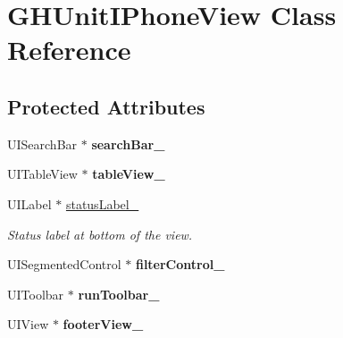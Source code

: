 \hypertarget{interface_g_h_unit_i_phone_view}{
\section{\-G\-H\-Unit\-I\-Phone\-View \-Class \-Reference}
\label{interface_g_h_unit_i_phone_view}
}
\subsection*{\-Protected \-Attributes}
\begin{DoxyCompactItemize}
\item 
\hypertarget{interface_g_h_unit_i_phone_view_a130641e5cd1b62824d73e4c19c73295b}{
\-U\-I\-Search\-Bar $\ast$ {\bfseries search\-Bar\-\_\-}}
\label{interface_g_h_unit_i_phone_view_a130641e5cd1b62824d73e4c19c73295b}

\item 
\hypertarget{interface_g_h_unit_i_phone_view_aa5426f813a9915e2af33ddbe666fbcde}{
\-U\-I\-Table\-View $\ast$ {\bfseries table\-View\-\_\-}}
\label{interface_g_h_unit_i_phone_view_aa5426f813a9915e2af33ddbe666fbcde}

\item 
\hypertarget{interface_g_h_unit_i_phone_view_abec8445a3fe7cfa33c98d566991d4b91}{
\-U\-I\-Label $\ast$ \hyperlink{interface_g_h_unit_i_phone_view_abec8445a3fe7cfa33c98d566991d4b91}{status\-Label\-\_\-}}
\label{interface_g_h_unit_i_phone_view_abec8445a3fe7cfa33c98d566991d4b91}

\begin{DoxyCompactList}\small\item\em \-Status label at bottom of the view. \end{DoxyCompactList}\item 
\hypertarget{interface_g_h_unit_i_phone_view_ab524336da780813fb3df8eebd29dae83}{
\-U\-I\-Segmented\-Control $\ast$ {\bfseries filter\-Control\-\_\-}}
\label{interface_g_h_unit_i_phone_view_ab524336da780813fb3df8eebd29dae83}

\item 
\hypertarget{interface_g_h_unit_i_phone_view_a57de8220d716e184b4b125b9715827bd}{
\-U\-I\-Toolbar $\ast$ {\bfseries run\-Toolbar\-\_\-}}
\label{interface_g_h_unit_i_phone_view_a57de8220d716e184b4b125b9715827bd}

\item 
\hypertarget{interface_g_h_unit_i_phone_view_a6c63d6f9aa13a63f30790fce6960a6bd}{
\-U\-I\-View $\ast$ {\bfseries footer\-View\-\_\-}}
\label{interface_g_h_unit_i_phone_view_a6c63d6f9aa13a63f30790fce6960a6bd}

\end{DoxyCompactItemize}
